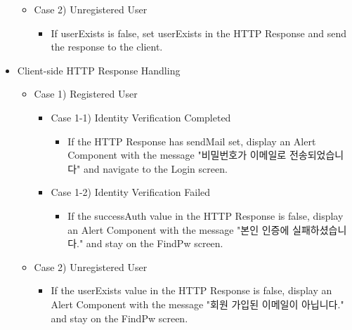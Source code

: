 \documentclass[conference]{IEEEtran}
\begin{document}
\begin{itemize}
\begin{itemize}
\begin{itemize}
\begin{itemize}
            \end{itemize}
        \end{itemize}
        \item Case 2) Unregistered User
        \begin{itemize}
            \item If userExists is false, set userExists in the HTTP Response and send the response to the client.
            \\
        \end{itemize}
    \end{itemize}
    \item Client-side HTTP Response Handling
    \begin{itemize}
        \item Case 1) Registered User
        \begin{itemize}
            \item Case 1-1) Identity Verification Completed
            \begin{itemize}
                \item If the HTTP Response has sendMail set, display an Alert Component with the message "비밀번호가 이메일로 전송되었습니다" and navigate to the Login screen.
            \end{itemize}
            \item Case 1-2) Identity Verification Failed
            \begin{itemize}
                \item If the successAuth value in the HTTP Response is false, display an Alert Component with the message "본인 인증에 실패하셨습니다." and stay on the FindPw screen.
            \end{itemize}
        \end{itemize}
        \item Case 2) Unregistered User
        \begin{itemize}
            \item If the userExists value in the HTTP Response is false, display an Alert Component with the message "회원 가입된 이메일이 아닙니다." and stay on the FindPw screen.
            \\
        \end{itemize}
    \end{itemize}
\end{itemize}
\end{document}
